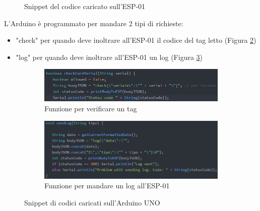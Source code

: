 \documentclass[12pt]{report}
\begin{document}
\begin{figure}
	\caption{Snippet del codice caricato sull'ESP-01}
	\label{fig:esp01_listen}
\end{figure}

L'Arduino è programmato per mandare 2 tipi di richieste: 

\begin{itemize}
	\item "check" per quando deve inoltrare all'ESP-01 il codice del tag letto (Figura \ref{fig:uno_check})
	\item "log" per quando deve inoltrare all'ESP-01 un log (Figura \ref{fig:uno_log})
\end{itemize}

\begin{figure}
	\centering
	\begin{subfigure}{0.5\textwidth}
		\centering
		\includegraphics[width=0.99\linewidth]{./img/uno_check.png}
		\caption{Funzione per verificare un tag}
		\label{fig:uno_check}
	\end{subfigure}%
	\begin{subfigure}{0.5\textwidth}
		\centering
		\includegraphics[width=0.99\linewidth]{./img/uno_log.png}
		\caption{Funzione per mandare un log all'ESP-01}
		\label{fig:uno_log}
	\end{subfigure}
	\caption{Snippet di codici caricati sull'Arduino UNO}
	\label{fig:uno_functions}
\end{figure}
\end{document}
